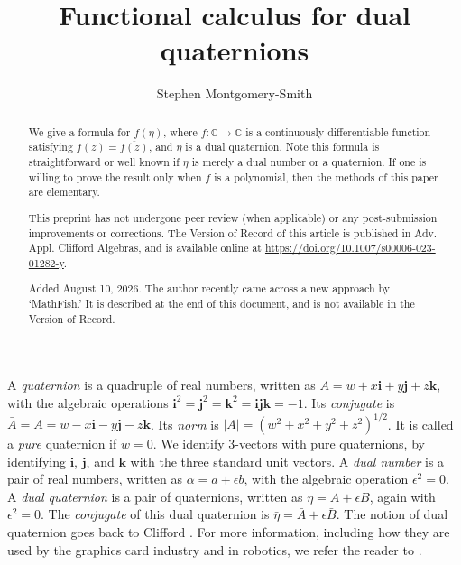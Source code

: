 \documentclass[12pt,reqno]{amsart}
\newcommand\bi{\bm i}
\newcommand\bj{\bm j}
\newcommand\bk{\bm k}
\begin{document}
\title{Functional calculus for dual quaternions}
\author{Stephen Montgomery-Smith}
\address{Department of Mathematics, University of Missouri, Columbia, MO 65211, USA\\
\rm\url{stephen@missouri.edu}\\
\rm\url{https://stephenmontgomerysmith.github.io}\\
}

\begin{abstract}  We give a formula for $f(\eta)$, where $f :\mathbb C \to \mathbb C$ is a continuously differentiable function satisfying
$f(\bar z) = \overline{f(z)}$,
and $\eta$ is a dual quaternion.  Note this formula is straightforward or well known if $\eta$ is merely a dual number or a quaternion.  If one is willing to prove the result only when $f$ is a polynomial, then the methods of this paper are elementary.

This preprint has not undergone peer review (when
applicable) or any post-submission improvements or corrections. The Version of Record of this
article is published in Adv. Appl. Clifford Algebras, and is available online at \url{https://doi.org/10.1007/s00006-023-01282-y}.

Added August 10, 2026.  The author recently came across a new approach by `MathFish.'  It is described at the end of this document, and is not available in the Version of Record.
\end{abstract}



\maketitle

A \emph{quaternion} is a quadruple of real numbers, written as $A = w + x \bi + y \bj + z \bk$, with the algebraic operations $\bi^2 = \bj^2 = \bk^2 = \bi \bj \bk = -1$.  Its \emph{conjugate} is $\bar A = A = w - x \bi - y \bj - z \bk$.  Its \emph{norm} is $|A| = (w^2+x^2+y^2+z^2)^{1/2}$.  It is called a \emph{pure} quaternion if $w = 0$.  We identify 3-vectors with pure quaternions, by identifying $\bi$, $\bj$, and $\bk$ with the three standard unit vectors.  A \emph{dual number} is a pair of real numbers, written as $\alpha = a + \epsilon b$, with the algebraic operation $\epsilon^2 = 0$.  A \emph{dual quaternion} is a pair of quaternions, written as $\eta = A + \epsilon B$, again with $\epsilon^2 = 0$.  The \emph{conjugate} of this dual quaternion is $\bar \eta = \bar A + \epsilon \bar B$.  The notion of dual quaternion goes back to Clifford \cite{clifford}.  For more information, including how they are used by the graphics card industry and in robotics, we refer the reader to \cite{adorno,agrawal,han-et-al,kavan-et-al,kavan-et-al-2,kenwright,kussaba-et-al,schilling1,schilling2,wiki-2,yang-et-al}.
\end{document}
